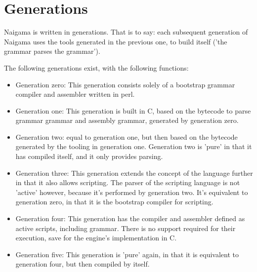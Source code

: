 \section{Generations}

Naigama is written in generations. That is to say:
each subsequent generation of Naigama uses the tools generated
in the previous one, to build itself ('the grammar parses the grammar').

The following generations exist, with the following functions:

\begin{itemize}

\item Generation zero: This generation consists solely of a bootstrap
      grammar compiler and assembler written in perl.

\item Generation one: This generation is
      built in C, based on the bytecode to parse grammar grammar
      and assembly grammar, generated by generation zero.

\item Generation two: equal to generation one, but then based on
      the bytecode generated by the tooling in generation one.
      Generation two is 'pure' in that it has compiled itself,
      and it only provides parsing.

\item Generation three: This generation extends the concept of the
      language further in that it also allows scripting.
      The parser of the scripting language is not 'active' however,
      because it's performed by generation two.
      It's equivalent to generation zero, in that it is the bootstrap
      compiler for scripting.

\item Generation four: This generation has the compiler and assembler
      defined as active scripts, including grammar. There is no
      support required for their execution, save for the engine's
      implementation in C.

\item Generation five: This generation is 'pure' again, in that it
      is equivalent to generation four, but then compiled by itself.

\end{itemize}
